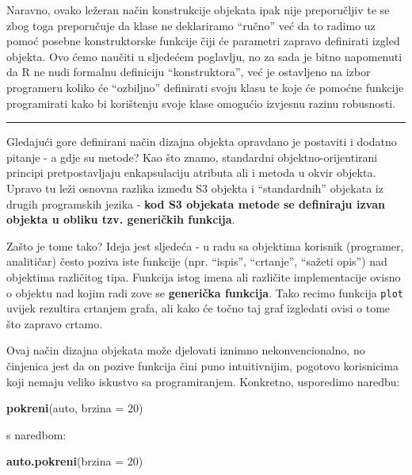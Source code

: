 \documentclass[]{book}
\newenvironment{Shaded}{\begin{snugshade}}{\end{snugshade}}
\newcommand{\KeywordTok}[1]{\textcolor[rgb]{0.13,0.29,0.53}{\textbf{#1}}}
\newcommand{\DataTypeTok}[1]{\textcolor[rgb]{0.13,0.29,0.53}{#1}}
\newcommand{\DecValTok}[1]{\textcolor[rgb]{0.00,0.00,0.81}{#1}}
\newcommand{\NormalTok}[1]{#1}
\theoremstyle{definition}
\theoremstyle{definition}
\theoremstyle{definition}
\theoremstyle{remark}
\begin{document}
Naravno, ovako ležeran način konstrukcije objekata ipak nije
preporučljiv te se zbog toga preporučuje da klase ne deklariramo
``ručno'' već da to radimo uz pomoć posebne konstruktorske funkcije čiji
će parametri zapravo definirati izgled objekta. Ovo ćemo naučiti u
sljedećem poglavlju, no za sada je bitno napomenuti da R ne nudi
formalnu definiciju ``konstruktora'', već je ostavljeno na izbor
programeru koliko će ``ozbiljno'' definirati svoju klasu te koje će
pomoćne funkcije programirati kako bi korištenju svoje klase omogućio
izvjesnu razinu robusnosti.

\begin{center}\rule{0.5\linewidth}{\linethickness}\end{center}

Gledajući gore definirani način dizajna objekta opravdano je postaviti i
dodatno pitanje - a gdje su metode? Kao što znamo, standardni
objektno-orijentirani principi pretpostavljaju enkapsulaciju atributa
ali i metoda u okvir objekta. Upravo tu leži osnovna razlika između S3
objekta i ``standardnih'' objekata iz drugih programskih jezika -
\textbf{kod S3 objekata metode se definiraju izvan objekta u obliku tzv.
generičkih funkcija}.

Zašto je tome tako? Ideja jest sljedeća - u radu sa objektima korisnik
(programer, analitičar) često poziva iste funkcije (npr. ``ispis'',
``crtanje'', ``sažeti opis'') nad objektima različitog tipa. Funkcija
istog imena ali različite implementacije ovisno o objektu nad kojim radi
zove se \textbf{generička funkcija}. Tako recimo funkcija \texttt{plot}
uvijek rezultira crtanjem grafa, ali kako će točno taj graf izgledati
ovisi o tome što zapravo crtamo.

Ovaj način dizajna objekata može djelovati iznimno nekonvencionalno, no
činjenica jest da on pozive funkcija čini puno intuitivnijim, pogotovo
korisnicima koji nemaju veliko iskustvo sa programiranjem. Konkretno,
usporedimo naredbu:

\begin{Shaded}
\begin{Highlighting}[]
\KeywordTok{pokreni}\NormalTok{(auto, }\DataTypeTok{brzina =} \DecValTok{20}\NormalTok{)}
\end{Highlighting}
\end{Shaded}

s naredbom:

\begin{Shaded}
\begin{Highlighting}[]
\KeywordTok{auto.pokreni}\NormalTok{(}\DataTypeTok{brzina =} \DecValTok{20}\NormalTok{)}
\end{Highlighting}
\end{Shaded}
\end{document}
